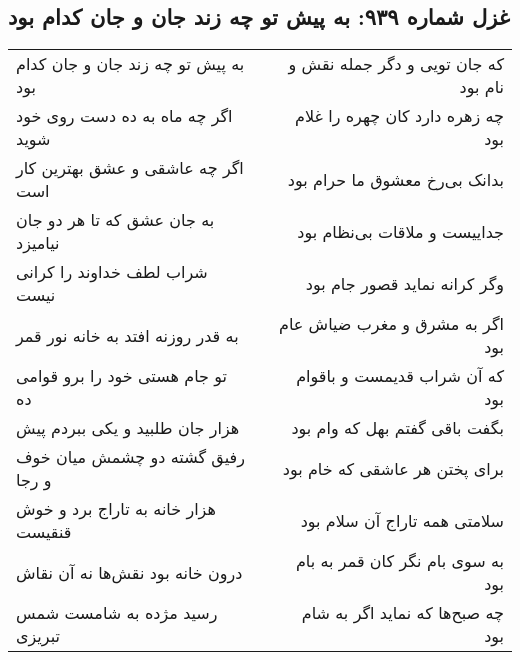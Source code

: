\begin{center}
\section*{غزل شماره ۹۳۹: به پیش تو چه زند جان و جان کدام بود}
\label{sec:0939}
\begin{longtable}{l p{0.5cm} r}
به پیش تو چه زند جان و جان کدام بود
&&
که جان تویی و دگر جمله نقش و نام بود
\\
اگر چه ماه به ده دست روی خود شوید
&&
چه زهره دارد کان چهره را غلام بود
\\
اگر چه عاشقی و عشق بهترین کار است
&&
بدانک بی‌رخ معشوق ما حرام بود
\\
به جان عشق که تا هر دو جان نیامیزد
&&
جداییست و ملاقات بی‌نظام بود
\\
شراب لطف خداوند را کرانی نیست
&&
وگر کرانه نماید قصور جام بود
\\
به قدر روزنه افتد به خانه نور قمر
&&
اگر به مشرق و مغرب ضیاش عام بود
\\
تو جام هستی خود را برو قوامی ده
&&
که آن شراب قدیمست و باقوام بود
\\
هزار جان طلبید و یکی ببردم پیش
&&
بگفت باقی گفتم بهل که وام بود
\\
رفیق گشته دو چشمش میان خوف و رجا
&&
برای پختن هر عاشقی که خام بود
\\
هزار خانه به تاراج برد و خوش قنقیست
&&
سلامتی همه تاراج آن سلام بود
\\
درون خانه بود نقش‌ها نه آن نقاش
&&
به سوی بام نگر کان قمر به بام بود
\\
رسید مژده به شامست شمس تبریزی
&&
چه صبح‌ها که نماید اگر به شام بود
\\
\end{longtable}
\end{center}
